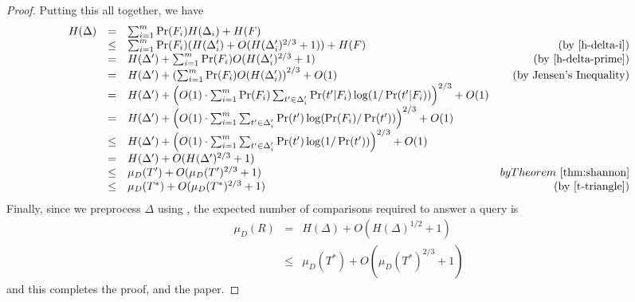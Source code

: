 \documentclass[lotsofwhite]{patmorin}
\begin{document}
\begin{proof}
Putting this all together, we have
\[
\begin{array}{rclr}
  H(\Delta) 
    &  =  & \sum_{i=1}^m\Pr(F_i) H(\Delta_i) + H(F) \\ 
    & \le & \sum_{i=1}^m\Pr(F_i) (H(\Delta'_i) 
             + O(H(\Delta'_i)^{2/3}+1)) + H(F) 
             & \mbox{\hfill{(by \eqref{h-delta-i})}} \\ 
    &  =  & H(\Delta') + \sum_{i=1}^m\Pr(F_i) O(H(\Delta'_i)^{2/3}+1)
             & \mbox{ (by \eqref{h-delta-prime})} \\ 
    &  =  & H(\Delta') + 
             \left(
               \sum_{i=1}^m\Pr(F_i) O(H(\Delta'_i)
             \right)^{2/3} + O(1)
             & \mbox{ (by Jensen's Inequality)} \\
    &  =  & H(\Delta') + 
             \left(
               O(1) \cdot
                \sum_{i=1}^m\Pr(F_i)
                 \sum_{t'\in\Delta'_i}
                  \Pr(t'|F_i)\log(1/\Pr(t'|F_i))
             \right)^{2/3} + O(1)
             &  \\
    &  =  & H(\Delta') + 
             \left(
               O(1) \cdot
                \sum_{i=1}^m
                 \sum_{t'\in\Delta'_i}
                  \Pr(t')\log(\Pr(F_i)/\Pr(t'))
             \right)^{2/3} + O(1)
             &  \\
    & \le & H(\Delta') + 
             \left(
               O(1) \cdot
                \sum_{i=1}^m
                 \sum_{t'\in\Delta'_i}
                  \Pr(t')\log(1/\Pr(t'))
             \right)^{2/3} + O(1)
             &  \\
    &  =  & H(\Delta') + O(H(\Delta')^{2/3}+1) \\
    & \le & \mu_D(T') + O(\mu_D(T')^{2/3}+1) 
          & by \thmref{shannon} \\
    & \le & \mu_D(T^*) + O(\mu_D(T^*)^{2/3}+1) 
             & \mbox{ (by \eqref{t-triangle})}
\end{array}
\]
Finally, since we preprocess $\Delta$ using , the
expected number of comparisons required to answer a query is
\begin{eqnarray*}
  \mu_D(R) 
   & = & H(\Delta) + O(H(\Delta)^{1/2} + 1) \\
   & \le & \mu_D(T^*) +  O(\mu_D(T^*)^{2/3} + 1) 
\end{eqnarray*}
and this completes the proof, and the paper.
\end{proof}



\end{document}
